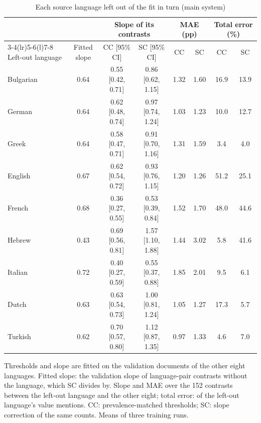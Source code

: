 \begin{table}[t]
\caption{Each source language left out of the fit in turn (main system)}
\label{tab:lolo}
\centering
\scriptsize
\setlength{\tabcolsep}{3pt}
\begin{tabular*}{\textwidth}{@{\extracolsep{\fill}}lccccccc@{}}
\toprule
 & & \multicolumn{2}{c}{Slope of its contrasts} & \multicolumn{2}{c}{MAE (pp)} & \multicolumn{2}{c}{Total error (\%)} \\
\cmidrule(lr){3-4}\cmidrule(lr){5-6}\cmidrule(l){7-8}
Left-out language & Fitted slope & CC [95\% CI] & SC [95\% CI] & CC & SC & CC & SC \\
\midrule
Bulgarian & 0.64 & 0.55 [0.42, 0.71] & 0.86 [0.62, 1.15] & 1.32 & 1.60 & 16.9 & 13.9 \\
German & 0.64 & 0.62 [0.48, 0.74] & 0.97 [0.74, 1.24] & 1.03 & 1.23 & 10.0 & 12.7 \\
Greek & 0.64 & 0.58 [0.47, 0.71] & 0.91 [0.70, 1.16] & 1.31 & 1.59 & 3.4 & 4.0 \\
English & 0.67 & 0.62 [0.54, 0.72] & 0.93 [0.76, 1.15] & 1.20 & 1.26 & 51.2 & 25.1 \\
French & 0.68 & 0.36 [0.27, 0.55] & 0.53 [0.39, 0.84] & 1.52 & 1.70 & 48.0 & 44.6 \\
Hebrew & 0.43 & 0.69 [0.56, 0.81] & 1.57 [1.10, 1.88] & 1.44 & 3.02 & 5.8 & 41.6 \\
Italian & 0.72 & 0.40 [0.27, 0.59] & 0.55 [0.37, 0.88] & 1.85 & 2.01 & 9.5 & 6.1 \\
Dutch & 0.63 & 0.63 [0.54, 0.73] & 1.00 [0.81, 1.24] & 1.05 & 1.27 & 17.3 & 5.7 \\
Turkish & 0.62 & 0.70 [0.57, 0.80] & 1.12 [0.87, 1.35] & 0.97 & 1.33 & 4.6 & 7.0 \\
\bottomrule
\end{tabular*}
\par\vspace{2pt}
\begin{minipage}{\textwidth}\scriptsize Thresholds and slope are fitted on the validation documents of the other eight languages. Fitted slope: the validation slope of language-pair contrasts without the language, which SC divides by. Slope and MAE over the 152 contrasts between the left-out language and the other eight; total error: of the left-out language's value mentions. CC: prevalence-matched thresholds; SC: slope correction of the same counts. Means of three training runs.\end{minipage}
\end{table}
